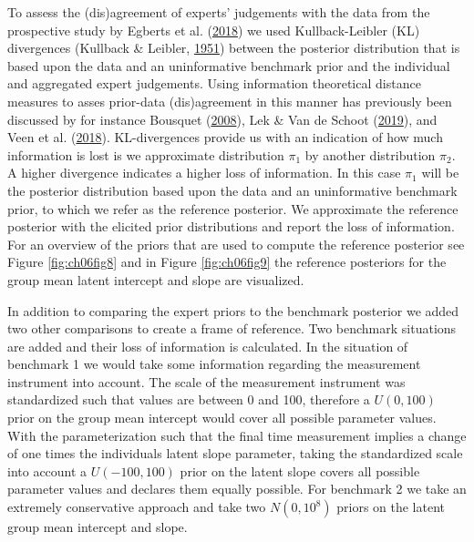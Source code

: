 \documentclass[openright,titlepage,12pt,a4paper]{book}
\begin{document}
To assess the (dis)agreement of experts' judgements with the data from the prospective study by Egberts et al. (\protect\hyperlink{ref-egberts_mother_2018}{2018}) we used Kullback-Leibler (KL) divergences (Kullback \& Leibler, \protect\hyperlink{ref-kullback_information_1951}{1951}) between the posterior distribution that is based upon the data and an uninformative benchmark prior and the individual and aggregated expert judgements. Using information theoretical distance measures to asses prior-data (dis)agreement in this manner has previously been discussed by for instance Bousquet (\protect\hyperlink{ref-bousquet_diagnostics_2008}{2008}), Lek \& Van de Schoot (\protect\hyperlink{ref-lek_how_2019}{2019}), and Veen et al. (\protect\hyperlink{ref-veen_using_2018}{2018}). KL-divergences provide us with an indication of how much information is lost is we approximate distribution \(\pi_1\) by another distribution \(\pi_2\). A higher divergence indicates a higher loss of information. In this case \(\pi_1\) will be the posterior distribution based upon the data and an uninformative benchmark prior, to which we refer as the reference posterior. We approximate the reference posterior with the elicited prior distributions and report the loss of information. For an overview of the priors that are used to compute the reference posterior see Figure \ref{fig:ch06fig8} and in Figure \ref{fig:ch06fig9} the reference posteriors for the group mean latent intercept and slope are visualized.

In addition to comparing the expert priors to the benchmark posterior we added two other comparisons to create a frame of reference. Two benchmark situations are added and their loss of information is calculated. In the situation of benchmark 1 we would take some information regarding the measurement instrument into account. The scale of the measurement instrument was standardized such that values are between 0 and 100, therefore a \(U(0, 100)\) prior on the group mean intercept would cover all possible parameter values. With the parameterization such that the final time measurement implies a change of one times the individuals latent slope parameter, taking the standardized scale into account a \(U(-100, 100)\) prior on the latent slope covers all possible parameter values and declares them equally possible. For benchmark 2 we take an extremely conservative approach and take two \(N(0, 10^8)\) priors on the latent group mean intercept and slope.
\end{document}
